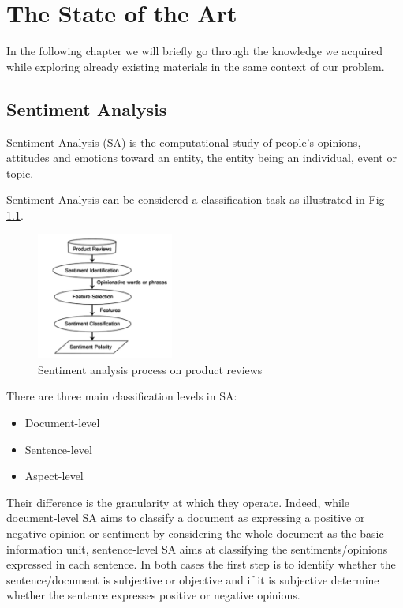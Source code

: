 \chapter{The State of the Art}

In the following chapter we will briefly go through the knowledge we acquired while exploring already existing materials in the same context of our problem.

\section{Sentiment Analysis} 
Sentiment Analysis (SA) is the computational study of people's opinions, attitudes and emotions toward an entity, the entity being an individual, event or topic.\cite{survey} \par

Sentiment Analysis can be considered a classification task as illustrated in Fig \ref{fig:sa_process}.\\

\begin{figure}[H]
\centering
\includegraphics[width=0.4\textwidth]{./chapters/chapter1/images/sa_process}
\caption{Sentiment analysis process on product reviews\cite{survey}}
\label{fig:sa_process}
\end{figure}

There are three main classification levels in SA: 
\begin{itemize}
\item Document-level
\item Sentence-level
\item Aspect-level
\end{itemize}
Their difference is the granularity at which they operate. Indeed, while document-level SA aims to classify a document as expressing a positive or negative opinion or sentiment by considering the whole document as the basic information unit, sentence-level SA aims at classifying the sentiments/opinions expressed in each sentence.
In both cases the first step is to identify whether the sentence/document is subjective or objective and if it is subjective determine whether the sentence expresses positive or negative opinions. \par

